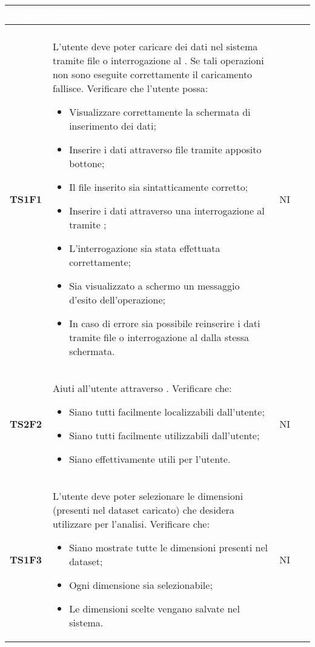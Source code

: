 \begin{longtable}{C{2cm} C{12cm} C{1.5cm}} 
		\textcolor{white}{\textbf{Codice}} & 
		\textcolor{white}{\textbf{Descrizione}} & 
		\textcolor{white}{\textbf{Stato}} \\
		\endfirsthead
		\\
	    \endfoot
	    \endlastfoot
		\hline
\textbf{TS1F1} & L'utente deve poter caricare dei dati nel sistema tramite file  o interrogazione al . Se tali operazioni non sono eseguite correttamente il caricamento fallisce. Verificare che l'utente possa: 
					\begin{itemize}
						\item Visualizzare correttamente la schermata di inserimento dei dati;
						\item Inserire i dati attraverso file  tramite apposito bottone;
						\item Il file  inserito sia sintatticamente corretto; 
						\item Inserire i dati attraverso una interrogazione al  tramite ;
						\item L'interrogazione sia stata effettuata correttamente;
						\item Sia visualizzato a schermo un messaggio d'esito dell'operazione;
						\item In caso di errore sia possibile reinserire i dati tramite file  o interrogazione al  dalla stessa schermata.
					\end{itemize}					 			    
			  & NI\\
\textbf{TS2F2} &  Aiuti all'utente attraverso . Verificare che:
					\begin{itemize}
						\item Siano tutti facilmente localizzabili dall'utente;
						\item Siano tutti facilmente utilizzabili dall'utente;
						\item Siano effettivamente utili per l'utente.
					\end{itemize}	
 			   & NI \\ 

\textbf{TS1F3} &  L'utente deve poter selezionare le dimensioni (presenti nel dataset caricato) che desidera utilizzare per l'analisi. Verificare che: 
					\begin{itemize}
						\item Siano mostrate tutte le dimensioni presenti nel dataset;			   
						\item Ogni dimensione sia selezionabile;
						\item Le dimensioni scelte vengano salvate nel sistema.
					\end{itemize}
			   &  NI \\



\end{longtable}
